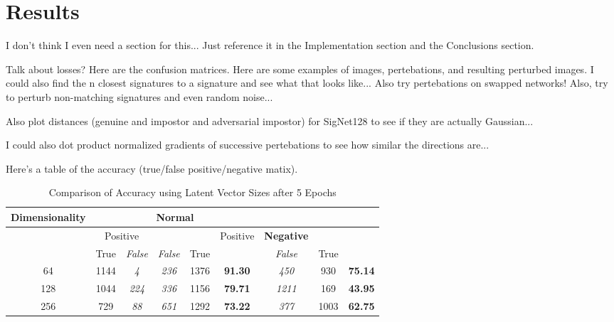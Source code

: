 \section{Results}\label{sec:results}

I don't think I even need a section for this...
Just reference it in the Implementation section and the Conclusions section.

Talk about losses?
Here are the confusion matrices.
Here are some examples of images, pertebations, and resulting perturbed images.
I could also find the n closest signatures to a signature and see what that looks like...
Also try pertebations on swapped networks!
Also, try to perturb non-matching signatures and even random noise...

Also plot distances (genuine and impostor and adversarial impostor) for SigNet128 to see if they are actually Gaussian...

I could also dot product normalized gradients of successive pertebations to see how similar the directions are...

Here's a table of the accuracy (true/false positive/negative matix).

\begin{table*}[t]
    \centering
    \begin{tabular}{|c | c >{\em}c | >{\em}c c | >{\bfseries}c | >{\em}c c >{\bfseries}c|}
        \hline
        \multirow{3}{*}{Dimensionality} & \multicolumn{5}{c|}{Normal} & \multicolumn{3}{c|}{Adversarial}\\
        \hline
        & \multicolumn{2}{c|}{Positive} & \multicolumn{2}{c|}{Negative} & \multirow{2}{*}{Accuracy} & Positive & Negative & \multirow{2}{*}{Accuracy}\\
        & True & False & False & True & & False & True & \\
        \hline
        64 & 1144 & 4 & 236 & 1376 & 91.30 & 450 & 930 & 75.14\\
        128 & 1044 & 224 & 336 & 1156 & 79.71 & 1211 & 169 & 43.95\\
        256 & 729 & 88 & 651 & 1292 & 73.22 & 377 & 1003 & 62.75\\ [0.1ex]
        \hline
    \end{tabular}
    \caption{Comparison of Accuracy using Latent Vector Sizes after 5 Epochs}
    \label{table:1}
\end{table*}

